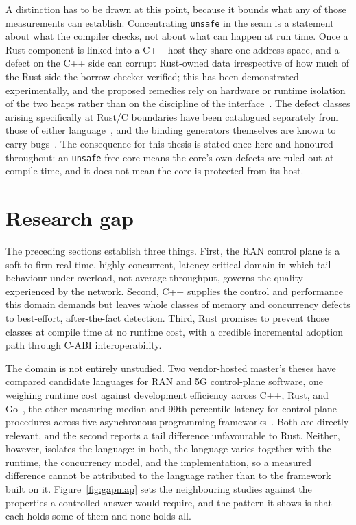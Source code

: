 \documentclass[english,twoside,openright,a4paper,censored,csm,software-track-2020]{HYthesisML}
\begin{document}
A distinction has to be drawn at this point, because it bounds what any of those measurements
can establish. Concentrating \texttt{unsafe} in the seam is a statement about what the compiler
checks, not about what can happen at run time. Once a Rust component is linked into a C++ host
they share one address space, and a defect on the C++ side can corrupt Rust-owned data
irrespective of how much of the Rust side the borrow checker verified; this has been
demonstrated experimentally, and the proposed remedies rely on hardware or runtime isolation of
the two heaps rather than on the discipline of the
interface~\cite{rivera2021galeed,kirth2022pkrusafe}. The defect classes arising specifically at
Rust/C boundaries have been catalogued separately from those of either
language~\cite{li2022crosslang}, and the binding generators themselves are known to carry
bugs~\cite{cai2026interop}. The consequence for this thesis is stated once here and honoured
throughout: an \texttt{unsafe}-free core means the core's own defects are ruled out at compile
time, and it does not mean the core is protected from its host.

\section{Research gap}\label{sec:gap}
The preceding sections establish three things. First, the RAN control plane is a
soft-to-firm real-time, highly concurrent, latency-critical domain in which tail behaviour
under overload, not average throughput, governs the quality experienced by the network.
Second, C++ supplies the control and performance this domain demands but leaves whole classes
of memory and concurrency defects to best-effort, after-the-fact detection. Third, Rust
promises to prevent those classes at compile time at no runtime cost, with a credible
incremental adoption path through C-ABI interoperability.

The domain is not entirely unstudied. Two vendor-hosted master's theses have compared
candidate languages for RAN and 5G control-plane software, one weighing runtime cost against
development efficiency across C++, Rust, and Go~\cite{karlback2021ran}, the other measuring
median and 99th-percentile latency for control-plane procedures across five asynchronous
programming frameworks~\cite{arvidsson2025async}. Both are directly relevant, and the second
reports a tail difference unfavourable to Rust. Neither, however, isolates the language:
in both, the language varies together with the runtime, the concurrency model, and the
implementation, so a measured difference cannot be attributed to the language rather than to
the framework built on it. Figure~\ref{fig:gapmap} sets the neighbouring studies against the
properties a controlled answer would require, and the pattern it shows is that each holds some
of them and none holds all.
\end{document}
